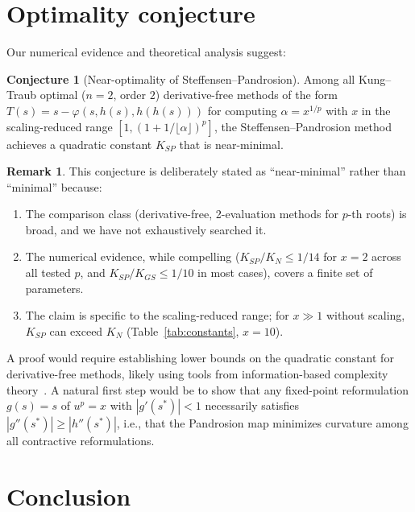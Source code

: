 \documentclass[11pt,a4paper]{article}
\theoremstyle{definition}
\newtheorem{remark}{Remark}[section]
\newtheorem{conjecture}{Conjecture}[section]
\begin{document}
\section{Optimality conjecture}
\label{sec:conjecture}

Our numerical evidence and theoretical analysis suggest:

\begin{conjecture}[Near-optimality of Steffensen--Pandrosion]
\label{conj:optimality}
Among all Kung--Traub optimal ($n = 2$, order $2$) derivative-free methods of the form $T(s) = s - \varphi(s, h(s), h(h(s)))$ for computing $\alpha = x^{1/p}$ with $x$ in the scaling-reduced range $[1, (1+1/\lfloor\alpha\rfloor)^p]$, the Steffensen--Pandrosion method achieves a quadratic constant $K_{SP}$ that is near-minimal.
\end{conjecture}

\begin{remark}
This conjecture is deliberately stated as ``near-minimal'' rather than ``minimal'' because:
\begin{enumerate}
  \item The comparison class (derivative-free, 2-evaluation methods for $p$-th roots) is broad, and we have not exhaustively searched it.
  \item The numerical evidence, while compelling ($K_{SP}/K_N \leq 1/14$ for $x = 2$ across all tested $p$, and $K_{SP}/K_{GS} \leq 1/10$ in most cases), covers a finite set of parameters.
  \item The claim is specific to the scaling-reduced range; for $x \gg 1$ without scaling, $K_{SP}$ can exceed $K_N$ (Table~\ref{tab:constants}, $x = 10$).
\end{enumerate}
A proof would require establishing lower bounds on the quadratic constant for derivative-free methods, likely using tools from information-based complexity theory~\cite{traub}.  A natural first step would be to show that any fixed-point reformulation $g(s) = s$ of $u^p = x$ with $|g'(s^*)| < 1$ necessarily satisfies $|g''(s^*)| \geq |h''(s^*)|$, i.e., that the Pandrosion map minimizes curvature among all contractive reformulations.
\end{remark}

\section{Conclusion}
\label{sec:conclusion}
\end{document}

